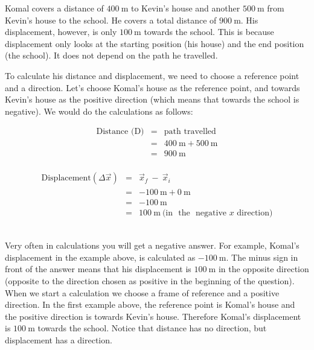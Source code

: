 Komal covers a distance of $400~\text{m}$ to Kevin's house and another $500~\text{m}$ from Kevin's house to the school. He covers a total distance of $900~\text{m}$. His displacement, however, is only $100~\text{m}$ towards the school. This is because displacement only looks at the starting position (his house) and the end position (the school). It does not depend on the path he travelled.
 
\label{m38788*id62121}To calculate his distance and displacement, we need to choose a reference point and a direction. Let's choose Komal's house as the reference point, and towards Kevin's house as the positive direction (which means that towards the school is negative). We would do the calculations as follows:\\
\begin{minipage}{0.35\textwidth}
\begin{eqnarray*}
\text{Distance (D)} &=& \text{path~travelled}\\
&=&400\ \text{m} + 500\ \text{m}\\
&=&900\ \text{m}\\
\end{eqnarray*}
\end{minipage}
\begin{minipage}{0.65\textwidth}
\begin{eqnarray*}
\text{Displacement} (\Delta \vec{x}) &=& \vec{x}_f~ - ~ \vec{x}_i\\
&=&-100\ \text{m} + 0\ \text{m}\\
&=&-100\ \text{m}\\
&=&100\ \text{m}~\text{(in ~the~ negative~} x \text{~direction)}
\end{eqnarray*}
\end{minipage}\vspace{\baselineskip}\\
Very often in calculations you will get a negative answer. For example, Komal's displacement in the example above, is calculated as $-100~\text{m}$. The minus sign in front of the answer means that his displacement is $100~\text{m}$ in the opposite direction (opposite to the direction chosen as positive in the beginning of the question). When we start a calculation we choose a frame of reference and a positive direction. In the first example above, the reference point is Komal's house and the positive direction is towards Kevin's house. Therefore Komal's displacement is $100~\text{m}$ towards the school. Notice that distance has no direction, but displacement has a direction.\\
